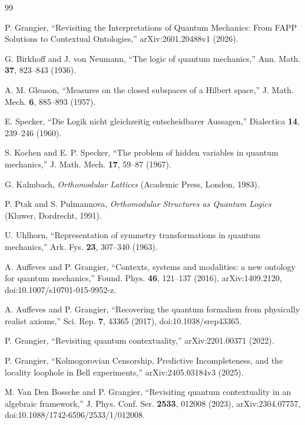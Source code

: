 \documentclass[
aps,
pra,
reprint,
superscriptaddress,
nofootinbib,
longbibliography
]{revtex4-2}
\begin{document}
\begin{thebibliography}{99}

P. Grangier,
``Revisiting the Interpretations of Quantum Mechanics:
From FAPP Solutions to Contextual Ontologies,''
arXiv:2601.20488v1 (2026).

G. Birkhoff and J. von Neumann,
``The logic of quantum mechanics,''
Ann. Math. \textbf{37}, 823--843 (1936).

A. M. Gleason,
``Measures on the closed subspaces of a Hilbert space,''
J. Math. Mech. \textbf{6}, 885--893 (1957).

E. Specker,
``Die Logik nicht gleichzeitig entscheidbarer Aussagen,''
Dialectica \textbf{14}, 239--246 (1960).

S. Kochen and E. P. Specker,
``The problem of hidden variables in quantum mechanics,''
J. Math. Mech. \textbf{17}, 59--87 (1967).

G. Kalmbach,
\emph{Orthomodular Lattices}
(Academic Press, London, 1983).

P. Ptak and S. Pulmannova,
\emph{Orthomodular Structures as Quantum Logics}
(Kluwer, Dordrecht, 1991).

U. Uhlhorn,
``Representation of symmetry transformations in quantum mechanics,''
Ark. Fys. \textbf{23}, 307--340 (1963).

A. Auffeves and P. Grangier,
``Contexts, systems and modalities: a new ontology for quantum mechanics,''
Found. Phys. \textbf{46}, 121--137 (2016), arXiv:1409.2120,
doi:10.1007/s10701-015-9952-z.

A. Auffeves and P. Grangier,
``Recovering the quantum formalism from physically realist axioms,''
Sci. Rep. \textbf{7}, 43365 (2017), doi:10.1038/srep43365.

P. Grangier,
``Revisiting quantum contextuality,''
arXiv:2201.00371 (2022).

P. Grangier,
``Kolmogorovian Censorship, Predictive Incompleteness, and the locality loophole in Bell experiments,''
arXiv:2405.03184v3 (2025).

M. Van Den Bossche and P. Grangier,
``Revisiting quantum contextuality in an algebraic framework,''
J. Phys. Conf. Ser. \textbf{2533}, 012008 (2023), arXiv:2304.07757,
doi:10.1088/1742-6596/2533/1/012008.


\end{thebibliography}
\end{document}
